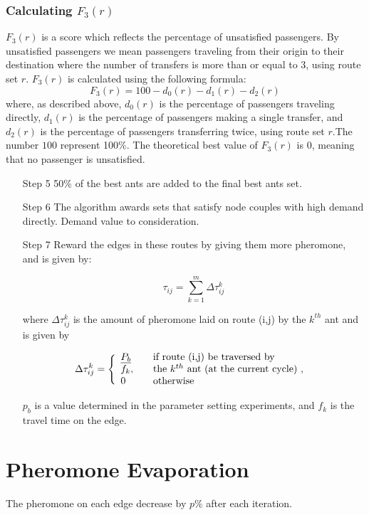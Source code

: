 \subsubsection*{Calculating $F_{3}(r)$}
\label{sec:f3}
$F_3(r)$ is a score which reflects the percentage of unsatisfied passengers. By unsatisfied passengers we mean passengers traveling from their origin to their destination where the number of transfers is more than or equal to 3, using route set $r$. $F_3(r)$ is calculated using the following formula:
\newline
$$F_3(r) = 100 - d_0(r) - d_1(r) - d_2(r)$$
\newline
where, as described above, $d_0(r)$ is the percentage of passengers traveling directly, $d_1(r)$ is the percentage of passengers making a single transfer, and $d_2(r)$ is the percentage of passengers transferring twice, using route set $r$.The number $100$ represent 100\%. The theoretical best value of $F_3(r)$ is 0, meaning that no passenger is unsatisfied. 
\begin{itemize}
\item[Step 5] 50\% of the best ants are added to the final best ants set.
\item[Step 6] The algorithm awards sets that satisfy node couples with high demand directly. Demand value to consideration.
\item[Step 7] Reward the edges in these routes by giving them more pheromone, and is given by:

$$ \tau_{ij} = \sum_{k=1}^{m} \Delta \tau^k_{ij}$$

where $ \Delta \tau^k_{ij} $ is the amount of pheromone laid on route (i,j) by the $k^{th}$ ant and is given by

$$
\Delta \tau^k_{ij} = \Bigg\{
\begin{array}{l l}
\underline{P_{b}} &  \quad \text{if route (i,j) be traversed by}\\
f_k, &  \quad \text{the $k^{th}$ ant (at the current cycle) , }\\
0 &  \quad \text{otherwise}
\end{array}
$$

$p_b$ is a value determined in the parameter setting experiments, and $f_k$ is the travel time on the edge.

\end{itemize}

\section{Pheromone Evaporation}

The pheromone on each edge decrease by $p\%$ after each iteration. 